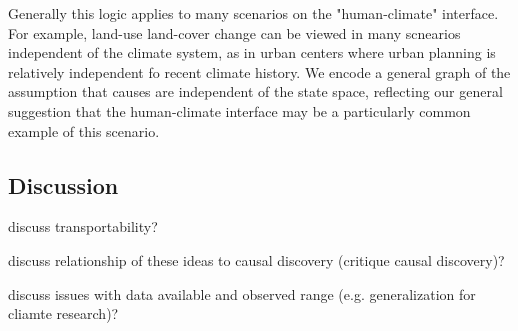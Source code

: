 \documentclass[12pt]{article}
\begin{document}
Generally this logic applies to many scenarios on the
"human-climate" interface. For example, land-use land-cover change
can be viewed in many scnearios independent of the climate system,
as in urban centers where urban planning is relatively independent
fo recent climate history. We encode a general graph of the
assumption that causes are independent of the state space,
reflecting our general suggestion that the human-climate interface
may be a particularly common example of this scenario.



\subsection{Discussion}

discuss transportability?

discuss relationship of these ideas to causal discovery (critique
causal discovery)?

discuss issues with data available and observed range
(e.g. generalization for cliamte research)?


\end{document}
